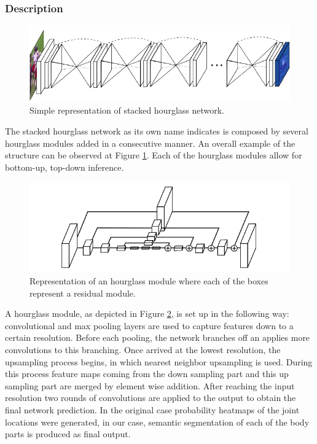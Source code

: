 \documentclass[12pt,a4paper]{article}
\begin{document}
\subsubsection{Description}

\begin{figure}
\centering
\includegraphics[scale=0.7]{stacked.png}
\caption{Simple representation of stacked hourglass network.}
\label{hourglass:stacked}
\end{figure}


The stacked hourglass network as its own name indicates is composed by several hourglass modules added in a consecutive manner. An overall example of the structure can be observed at Figure \ref{hourglass:stacked}. Each of the hourglass modules allow for bottom-up, top-down inference.\\

\begin{figure}
\centering
\includegraphics[scale=0.7]{hourmodule.png}
\caption{Representation of an hourglass module where each of the boxes represent a residual module.}
\label{hourglass:module}
\end{figure}

A hourglass module, as depicted in Figure \ref{hourglass:module}, is set up in the following way: convolutional and max pooling layers are used to capture features down to a certain resolution. Before each pooling, the network branches off an applies more convolutions to this branching. Once arrived at the lowest resolution, the upsampling process begins, in which nearest neighbor upsampling is used. During this process feature maps coming from the down sampling part and this up sampling part are merged by element wise addition. After reaching the input resolution two rounds of convolutions are applied to the output to obtain the final network prediction. In the original case probability heatmaps of the joint locations were generated, in our case, semantic segmentation of each of the body parts is produced as final output.\\
\end{document}
